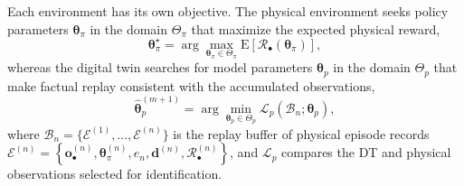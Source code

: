 \documentclass[journal]{IEEEtran}
\begin{document}
Each environment has its own objective. The physical environment seeks policy parameters $\boldsymbol{\theta}_{\pi}$ in the domain $\Theta_{\pi}$ that maximize the expected physical reward,
\begin{equation}
\boldsymbol{\theta}_{\pi}^{\star}
=\arg\max_{\boldsymbol{\theta}_{\pi}\in\Theta_{\pi}}
\mathrm{E}\!\left[\mathcal R_{\bullet}
(\boldsymbol{\theta}_{\pi})\right],
\label{eq:rt-physical-objective}
\end{equation}
whereas the digital twin searches for model parameters $\boldsymbol{\theta}_{p}$  in the domain $\Theta_{p}$ that make factual replay consistent with the accumulated observations,
\begin{equation}
\widehat{\boldsymbol{\theta}}_{p}^{(m+1)}
=\arg\min_{\boldsymbol{\theta}_{p}\in\Theta_p}
\mathcal L_p\!\left(
\mathcal B_n;\boldsymbol{\theta}_{p}
\right),
\label{eq:rt-model-objective}
\end{equation}
where $\mathcal B_n=\{\mathcal E^{(1)},\ldots,\mathcal E^{(n)}\}$ is the replay buffer of physical episode records
$
\mathcal{E}^{(n)} = \left\{
\boldsymbol{o}_{\bullet}^{(n)},
\boldsymbol{\theta}_{\pi}^{(n)},
e_n,
\mathbf d^{(n)},
\mathcal{R}_{\bullet}^{(n)}
\right\}$,
and $\mathcal{L}_p$ compares the DT and physical observations selected for identification.
\end{document}

